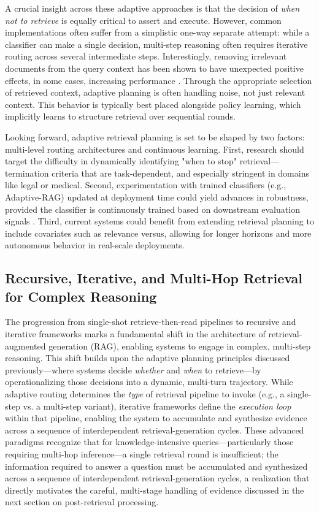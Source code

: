 \documentclass[11pt,a4paper]{article}
\begin{document}
A crucial insight across these adaptive approaches is that the decision of \emph{when not to retrieve} is equally critical to assert and execute. However, common implementations often suffer from a simplistic one-way separate attempt: while a classifier can make a single decision, multi-step reasoning often requires iterative routing across several intermediate steps. Interestingly, removing irrelevant documents from the query context has been shown to have unexpected positive effects, in some cases, increasing performance \cite{arxiv:2401.14887v3}. Through the appropriate selection of retrieved context, adaptive planning is often handling noise, not just relevant context. This behavior is typically best placed alongside policy learning, which implicitly learns to structure retrieval over sequential rounds.

Looking forward, adaptive retrieval planning is set to be shaped by two factors: multi-level routing architectures and continuous learning. First, research should target the difficulty in dynamically identifying "when to stop" retrieval---termination criteria that are task-dependent, and especially stringent in domains like legal or medical. Second, experimentation with trained classifiers (e.g., Adaptive-RAG) updated at deployment time could yield advances in robustness, provided the classifier is continuously trained based on downstream evaluation signals \cite{arxiv:2403.14403v2}. Third, current systems could benefit from extending retrieval planning to include covariates such as relevance versus, allowing for longer horizons and more autonomous behavior in real-scale deployments.


\subsection{Recursive, Iterative, and Multi-Hop Retrieval for Complex Reasoning}


The progression from single-shot retrieve-then-read pipelines to recursive and iterative frameworks marks a fundamental shift in the architecture of retrieval-augmented generation (RAG), enabling systems to engage in complex, multi-step reasoning. This shift builds upon the adaptive planning principles discussed previously---where systems decide \emph{whether} and \emph{when} to retrieve---by operationalizing those decisions into a dynamic, multi-turn trajectory. While adaptive routing determines the \emph{type} of retrieval pipeline to invoke (e.g., a single-step vs. a multi-step variant), iterative frameworks define the \emph{execution loop} within that pipeline, enabling the system to accumulate and synthesize evidence across a sequence of interdependent retrieval-generation cycles. These advanced paradigms recognize that for knowledge-intensive queries---particularly those requiring multi-hop inference---a single retrieval round is insufficient; the information required to answer a question must be accumulated and synthesized across a sequence of interdependent retrieval-generation cycles, a realization that directly motivates the careful, multi-stage handling of evidence discussed in the next section on post-retrieval processing.
\end{document}
